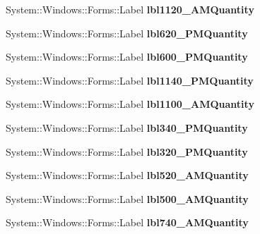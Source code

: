 \begin{DoxyCompactItemize}
System\+::\+Windows\+::\+Forms\+::\+Label {\bfseries lbl1120\+\_\+A\+M\+Quantity}
\item 
\mbox{\label{class_project1_1_1_my_form_a837d801558d16d5687561bfa49bcbb07}} 
System\+::\+Windows\+::\+Forms\+::\+Label {\bfseries lbl620\+\_\+P\+M\+Quantity}
\item 
\mbox{\label{class_project1_1_1_my_form_af438d9f38d8db77d642fa898515f12e8}} 
System\+::\+Windows\+::\+Forms\+::\+Label {\bfseries lbl600\+\_\+P\+M\+Quantity}
\item 
\mbox{\label{class_project1_1_1_my_form_a06461fa60aa7a41b373d8d3ab31e9108}} 
System\+::\+Windows\+::\+Forms\+::\+Label {\bfseries lbl1140\+\_\+P\+M\+Quantity}
\item 
\mbox{\label{class_project1_1_1_my_form_aef43749d0ecaa469c871979edfc97c3a}} 
System\+::\+Windows\+::\+Forms\+::\+Label {\bfseries lbl1100\+\_\+A\+M\+Quantity}
\item 
\mbox{\label{class_project1_1_1_my_form_a1851816d7aed6b9364b786d572c98fc2}} 
System\+::\+Windows\+::\+Forms\+::\+Label {\bfseries lbl340\+\_\+P\+M\+Quantity}
\item 
\mbox{\label{class_project1_1_1_my_form_ad80b53c481514c4bdc2b51fab891192a}} 
System\+::\+Windows\+::\+Forms\+::\+Label {\bfseries lbl320\+\_\+P\+M\+Quantity}
\item 
\mbox{\label{class_project1_1_1_my_form_a0395e4aa14e6d5a6185386958f145fc2}} 
System\+::\+Windows\+::\+Forms\+::\+Label {\bfseries lbl520\+\_\+A\+M\+Quantity}
\item 
\mbox{\label{class_project1_1_1_my_form_a65f4ffd10dff1326f4491cee2f6ff395}} 
System\+::\+Windows\+::\+Forms\+::\+Label {\bfseries lbl500\+\_\+A\+M\+Quantity}
\item 
\mbox{\label{class_project1_1_1_my_form_a895ee226d5c3dc5ce5bbfbb98f1d8ee0}} 
System\+::\+Windows\+::\+Forms\+::\+Label {\bfseries lbl740\+\_\+A\+M\+Quantity}

\end{DoxyCompactItemize}
